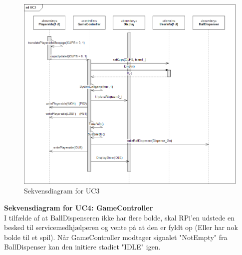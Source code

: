 \documentclass[Arkitektur/System_main.tex]{subfiles}
\begin{document}
\begin{figure}[H]
    \centering
    \includegraphics[width=\textwidth]{Arkitektur/Softwarearkitektur/Applikationsmodel/RPi/graphics_RPi/UC3_SD.png}
   \caption{Sekvensdiagram for UC3}
    \label{fig:UC3_SD_RPi}
\end{figure}

\newpage
\textbf{Sekvensdiagram for UC4: GameController}\\
I tilfælde af at BallDispenseren ikke har flere bolde, skal RPi'en udstede en besked til servicemedhjælperen og vente på at den er fyldt op (Eller har nok bolde til et spil). Når GameController modtager signalet "NotEmpty" fra BallDispenser kan den initiere stadiet "IDLE" igen. 
\end{document}
